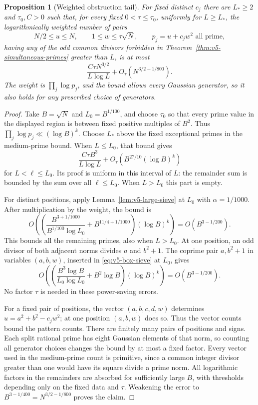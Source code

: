 \documentclass[11pt]{article}
\newtheorem{proposition}[theorem]{Proposition}
\theoremstyle{definition}
\theoremstyle{remark}
\begin{document}
\begin{proposition}[Weighted obstruction tail]\label{prop:v5-obstruction-tail}
For fixed distinct $c_j$ there are $L_*\geq2$ and $\tau_0,C>0$
such that, for every fixed $0<\tau\leq\tau_0$, uniformly for $L\geq L_*$,
the logarithmically weighted number of pairs
\[
 N/2\leq u\leq N,\qquad 1\leq w\leq\tau\sqrt N,
 \qquad p_j=u+c_jw^2\text{ all prime},
\]
having any of the odd common divisors forbidden in
Theorem~\ref{thm:v5-simultaneous-primes} greater than $L$, is at most
\begin{equation}\label{eq:v5-obstruction-tail}
 \frac{C\tau N^{3/2}}{L\log L}
       +O_\tau(N^{3/2-1/800}).
\end{equation}
The weight is $\prod_j\log p_j$, and the bound allows every Gaussian
generator, so it also holds for any prescribed choice of generators.
\end{proposition}
\begin{proof}
Take $B=\sqrt N$ and $L_0=B^{1/100}$, and choose $\tau_0$ so that
every prime value in the displayed region is between fixed positive
multiples of $B^2$. Thus $\prod_j\log p_j\ll (\log B)^k$.
Choose $L_*$ above the fixed exceptional primes in the medium-prime bound.
When $L\leq L_0$, that bound gives
\[
 \frac{C\tau B^3}{L\log L}+O_\tau(B^{27/10}(\log B)^k)
\]
for $L<\ell\leq L_0$. Its proof is uniform in this interval of $L$:
the remainder sum is bounded by the sum over all $\ell\leq L_0$.
When $L>L_0$ this part is empty.

For distinct positions, apply Lemma~\ref{lem:v5-large-sieve} at $L_0$
with $\alpha=1/1000$. After multiplication by the weight, the bound is
\[
 O\left(\left(
   \frac{B^{3+1/1000}}{B^{1/100}\log L_0}
       +B^{11/4+1/1000}\right)(\log B)^k\right)
 =O(B^{3-1/200}).
\]
This bounds all the remaining primes, also when $L>L_0$.
At one position, an odd divisor of both adjacent norms divides
$a$ and $b^2+1$. The coprime pair $a,b^2+1$ in variables $(a,b,w)$,
inserted in \eqref{eq:v5-box-sieve} at $L_0$, gives
\[
 O\left(\left(
 \frac{B^3\log B}{L_0\log L_0}+B^2\log B\right)(\log B)^k\right)
 =O(B^{3-1/200}).
\]
No factor $\tau$ is needed in these power-saving errors.

For a fixed pair of positions, the vector $(a,b,c,d,w)$ determines
$u=a^2+b^2-c_jw^2$; at one position $(a,b,w)$ does so.
Thus the vector counts bound the pattern counts. There are finitely many
pairs of positions and signs. Each split rational prime has eight
Gaussian elements of that norm, so counting all generator choices
changes the bound by at most a fixed factor. Every vector used in the
medium-prime count is primitive, since a common integer divisor greater
than one would have its square divide a prime norm.
All logarithmic factors in the remainders are absorbed for sufficiently
large $B$, with thresholds depending only on the fixed data and $\tau$.
Weakening the error to $B^{3-1/400}=N^{3/2-1/800}$ proves the claim.
\end{proof}
\end{document}
